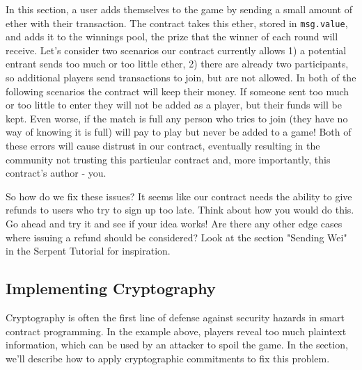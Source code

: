 \documentclass[12pt]{article}
\begin{document}

In this section, a user adds themselves to the game by sending a small amount of ether with their transaction. The contract takes this ether, stored in \texttt{msg.value}, and adds it to the winnings pool, the prize that the winner of each round will receive. Let's consider two scenarios our contract currently allows 1) a potential entrant sends too much or too little ether, 2) there are already two participants, so additional players send transactions to join, but are not allowed. In both of the following scenarios the contract will keep their money. If someone sent too much or too little to enter they will not be added as a player, but their funds will be kept. Even worse, if the match is full any person who tries to join (they have no way of knowing it is full) will pay to play but never be added to a game! Both of these errors will cause distrust in our contract, eventually resulting in the community not trusting this particular contract and, more importantly, this contract's author - you.

So how do we fix these issues? It seems like our contract needs the ability to give refunds to users who try to sign up too late. Think about how you would do this. Go ahead and try it and see if your idea works! Are there any other edge cases where issuing a refund should be considered? Look at the section "Sending Wei" in the Serpent Tutorial for inspiration.

\subsection{Implementing Cryptography}
Cryptography is often the first line of defense against security hazards in smart contract programming. In the example above, players reveal too much plaintext information, which can be used by an attacker to spoil the game. In the section, we'll describe how to apply cryptographic commitments to fix this problem.
\end{document}
